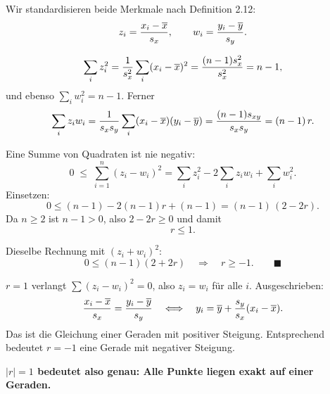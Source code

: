 \begin{merksatz}
Wir standardisieren beide Merkmale nach Definition 2.12:
\[ z_i = \frac{x_i-\overline{x}}{s_x}, \qquad w_i = \frac{y_i-\overline y}{s_y} . \]

\[ \sum_i z_i^2 = \frac{1}{s_x^2}\sum_i (x_i-\overline{x})^2 = \frac{(n-1)s_x^2}{s_x^2} = n-1 , \]
und ebenso $\sum_i w_i^2 = n-1$. Ferner
\[ \sum_i z_i w_i = \frac{1}{s_xs_y}\sum_i (x_i-\overline{x})(y_i-\overline y) = \frac{(n-1)s_{xy}}{s_xs_y} = (n-1)\,r . \]

Eine Summe von Quadraten ist nie negativ:
\[ 0 \;\le\; \sum_{i=1}^n (z_i - w_i)^2 = \sum_i z_i^2 - 2\sum_i z_iw_i + \sum_i w_i^2 . \]
Einsetzen:
\[ 0 \le (n-1) - 2(n-1)r + (n-1) = (n-1)\,(2 - 2r) . \]
Da $n \ge 2$ ist $n-1 > 0$, also $2 - 2r \ge 0$ und damit
\[ r \le 1 . \]

Dieselbe Rechnung mit $(z_i + w_i)^2$:
\[ 0 \le (n-1)(2+2r) \quad\Longrightarrow\quad r \ge -1 . \qquad \blacksquare \]

$r = 1$ verlangt $\sum(z_i-w_i)^2 = 0$, also $z_i = w_i$ für alle $i$. Ausgeschrieben:
\[ \frac{x_i-\overline{x}}{s_x} = \frac{y_i-\overline y}{s_y} \quad\Longleftrightarrow\quad y_i = \overline y + \frac{s_y}{s_x}(x_i - \overline{x}) . \]
Das ist die Gleichung einer Geraden mit positiver Steigung. Entsprechend bedeutet $r = -1$ eine Gerade mit negativer Steigung.

\begin{center}
\begin{minipage}{0.9\textwidth}
\textbf{$|r| = 1$ bedeutet also genau: Alle Punkte liegen exakt auf einer Geraden.}
\end{minipage}
\end{center}
\end{merksatz}

